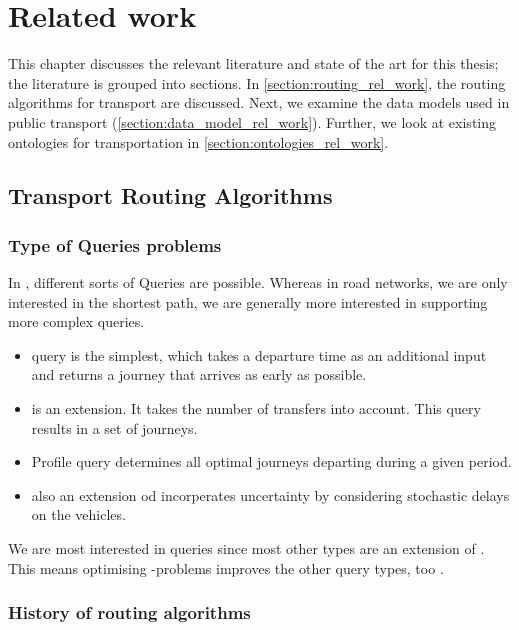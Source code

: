 \chapter{Related work}
\label{chap:rel_work}
This chapter discusses the relevant literature and state of the art for this thesis; the literature is grouped into  sections. In \autoref{section:routing_rel_work}, the routing algorithms for transport are discussed. Next, we examine the data models used in public transport (\autoref{section:data_model_rel_work}). Further, we look at existing ontologies for transportation in \autoref{section:ontologies_rel_work}.

\section{Transport Routing Algorithms }\label{section:routing_rel_work}

\subsection{Type of Queries problems}
In , different sorts of Queries are possible. Whereas in road networks, we are only interested in the shortest path, we are generally more interested in supporting more complex queries. 
\begin{itemize}
    \item {} query is the simplest, which takes a departure time as an additional input and returns a journey that arrives as early as possible.
    \item {} is an extension. It takes the number of transfers into account. This query results in a set of journeys.
    \item Profile query determines all optimal journeys departing during a given period.
    \item {} \cite{dibbelt_intriguingly_2013} also an extension od  incorperates uncertainty by considering stochastic delays on the vehicles.
\end{itemize}

We are most interested in  queries since most other types are an extension of . This means optimising -problems improves the other query types, too \cite{rojas_melendez_publishing_2022}.  
\subsection{History of routing algorithms}



